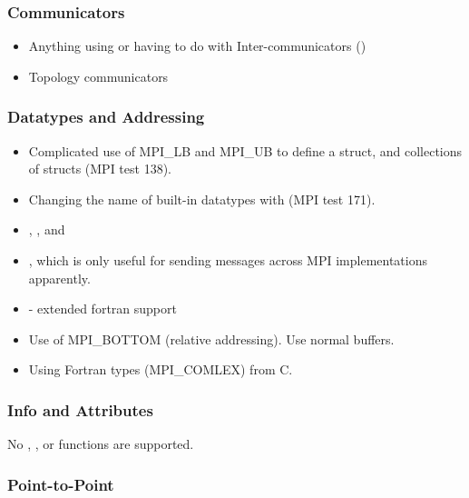 \subsubsection{Communicators}
\label{subsubsec:issues:mpi:comm}

\begin{itemize}
\item Anything using or having to do with Inter-communicators ()
\item Topology communicators
\end{itemize}

\subsubsection{Datatypes and Addressing}
\label{subsubsec:issues:mpi:types}

\begin{itemize}
\item Complicated use of MPI\_LB and MPI\_UB to define a struct, and collections of structs (MPI test 138). 
\item Changing the name of built-in datatypes with  (MPI test 171).
\item {}, , and 
\item {}, which is only useful for sending messages across MPI implementations apparently.
\item {}  - extended fortran support
\item Use of MPI\_BOTTOM (relative addressing).  Use normal buffers. 
\item Using Fortran types (\eg MPI\_COMLEX) from C.
\end{itemize}


\subsubsection{Info and Attributes}
\label{subsubsec:issues:mpi:info}

No , , or  functions are supported.

\subsubsection{Point-to-Point}
\label{subsubsec:issues:mpi:ptpt}

